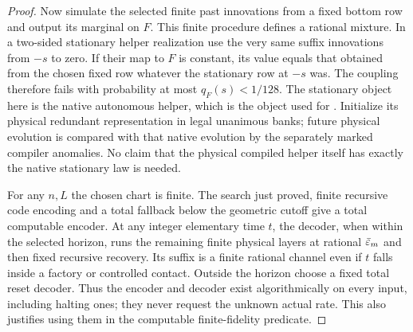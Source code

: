 \begin{proof}
Now simulate the selected finite past innovations from a fixed bottom row and output its marginal on \(F\). This finite procedure defines a rational mixture. In a two-sided stationary helper realization use the very same suffix innovations from \(-s\) to zero. If their map to \(F\) is constant, its value equals that obtained from the chosen fixed row whatever the stationary row at \(-s\) was. The coupling therefore fails with probability at most \(q_{F}(s)<1/128\). The stationary object here is the native autonomous helper, which is the object used for \cite[Lemma~\ref*{cl:lem:past}]{DMNoise1D2026}. Initialize its physical redundant representation in legal unanimous banks; future physical evolution is compared with that native evolution by the separately marked compiler anomalies. No claim that the physical compiled helper itself has exactly the native stationary law is needed.

For any \(n,L\) the chosen chart is finite. The search just proved, finite recursive code encoding and a total fallback below the geometric cutoff give a total computable encoder. At any integer elementary time \(t\), the decoder, when within the selected horizon, runs the remaining finite physical layers at rational \(\bar{\varepsilon}_{m}\) and then fixed recursive recovery. Its suffix is a finite rational channel even if \(t\) falls inside a factory or controlled contact. Outside the horizon choose a fixed total reset decoder. Thus the encoder and decoder exist algorithmically on every input, including halting ones; they never request the unknown actual rate. This also justifies using them in the computable finite-fidelity predicate.


\end{proof}
